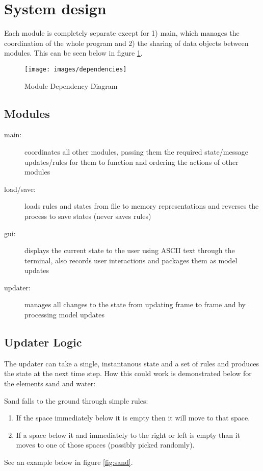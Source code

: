 \section{System design}
Each module is completely separate except for 1) main, which manages the coordination
of the whole program and 2) the sharing of data objects between modules. This can be
seen below in figure \ref{fig:dep}.

\begin{figure}[H]
  \caption{Module Dependency Diagram}
  \label{fig:dep}
  \vspace{3em}
  \center\texttt{[image: images/dependencies]}
\end{figure}

\subsection{Modules}
\begin{description}
  \item[main:] coordinates all other modules, passing them the required state/message updates/rules for them to function and ordering the actions of other modules
  \item[load/save:] loads rules and states from file to memory representations and reverses the process to save states (never saves rules)
  \item[gui:] displays the current state to the user using ASCII text through the terminal, also records user interactions and packages them as model updates
  \item[updater:] manages all changes to the state from updating frame to frame and by processing model updates
\end{description}

\subsection{Updater Logic}
The updater can take a single, instantanous state and a set of rules and produces the state at
the next time step. How this could work is demonstrated below for the elements sand and water:

Sand falls to the ground through simple rules:
\begin{enumerate}
  \item If the space immediately below it is empty then it will move to that space.
  \item If a space below it and immediately to the right or left is empty than it moves
    to one of those spaces (possibly picked randomly).
\end{enumerate}
See an example below in figure \ref{fig:sand}.


